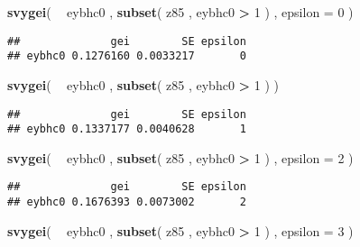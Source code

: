 \documentclass[]{book}
\newenvironment{Shaded}{\begin{snugshade}}{\end{snugshade}}
\newcommand{\DataTypeTok}[1]{\textcolor[rgb]{0.13,0.29,0.53}{#1}}
\newcommand{\DecValTok}[1]{\textcolor[rgb]{0.00,0.00,0.81}{#1}}
\newcommand{\KeywordTok}[1]{\textcolor[rgb]{0.13,0.29,0.53}{\textbf{#1}}}
\newcommand{\NormalTok}[1]{#1}
\newcommand{\OperatorTok}[1]{\textcolor[rgb]{0.81,0.36,0.00}{\textbf{#1}}}
\newcommand{\StringTok}[1]{\textcolor[rgb]{0.31,0.60,0.02}{#1}}
\begin{document}
\begin{Shaded}
\begin{Highlighting}[]
\KeywordTok{svygei}\NormalTok{( }\OperatorTok{~}\StringTok{ }\NormalTok{eybhc0 , }\KeywordTok{subset}\NormalTok{( z85 , eybhc0 }\OperatorTok{>}\StringTok{ }\DecValTok{1}\NormalTok{ ) , }\DataTypeTok{epsilon =} \DecValTok{0}\NormalTok{ )}
\end{Highlighting}
\end{Shaded}

\begin{verbatim}
##              gei        SE epsilon
## eybhc0 0.1276160 0.0033217       0
\end{verbatim}

\begin{Shaded}
\begin{Highlighting}[]
\KeywordTok{svygei}\NormalTok{( }\OperatorTok{~}\StringTok{ }\NormalTok{eybhc0 , }\KeywordTok{subset}\NormalTok{( z85 , eybhc0 }\OperatorTok{>}\StringTok{ }\DecValTok{1}\NormalTok{ ) )}
\end{Highlighting}
\end{Shaded}

\begin{verbatim}
##              gei        SE epsilon
## eybhc0 0.1337177 0.0040628       1
\end{verbatim}

\begin{Shaded}
\begin{Highlighting}[]
\KeywordTok{svygei}\NormalTok{( }\OperatorTok{~}\StringTok{ }\NormalTok{eybhc0 , }\KeywordTok{subset}\NormalTok{( z85 , eybhc0 }\OperatorTok{>}\StringTok{ }\DecValTok{1}\NormalTok{ ) , }\DataTypeTok{epsilon =} \DecValTok{2}\NormalTok{ )}
\end{Highlighting}
\end{Shaded}

\begin{verbatim}
##              gei        SE epsilon
## eybhc0 0.1676393 0.0073002       2
\end{verbatim}

\begin{Shaded}
\begin{Highlighting}[]
\KeywordTok{svygei}\NormalTok{( }\OperatorTok{~}\StringTok{ }\NormalTok{eybhc0 , }\KeywordTok{subset}\NormalTok{( z85 , eybhc0 }\OperatorTok{>}\StringTok{ }\DecValTok{1}\NormalTok{ ) , }\DataTypeTok{epsilon =} \DecValTok{3}\NormalTok{ )}
\end{Highlighting}
\end{Shaded}
\end{document}

